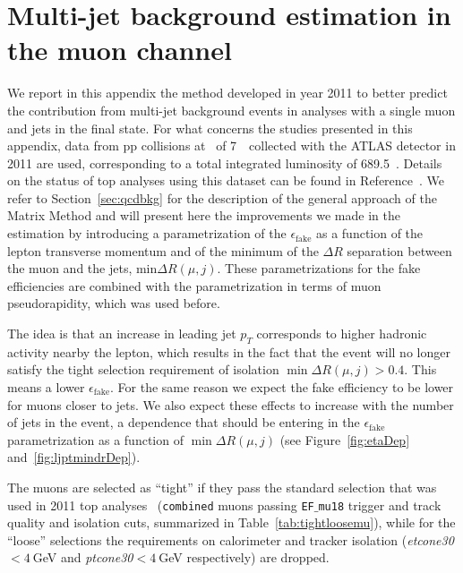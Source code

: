 \clearpage{\pagestyle{empty}\cleardoublepage}

\chapter{Multi-jet background estimation in the muon channel}\label{app:qcdmm}

We report in this appendix the method developed in year 2011 to better predict
the contribution from multi-jet background events in analyses with a single
muon and jets in the final state. 
For what concerns the studies presented in this appendix, data
from pp collisions at \cme\ of 7~\tev\ collected with the ATLAS
detector in 2011 are used, corresponding to a total integrated luminosity
of 689.5~\ipb. Details on the status of top analyses
using this dataset can be found in Reference~\cite{topCommonObjects2012}.
We refer to Section~\ref{sec:qcdbkg}
for the description of the general approach of the
Matrix Method and will present here the improvements we
made in the estimation by introducing a parametrization of
the $\epsilon_\mathrm{fake}$ as a function of the lepton
transverse momentum and of the minimum of the $\Delta R$ separation
between the muon and the jets,  min$\Delta R(\mu,j)$.
These parametrizations for the fake efficiencies 
are combined with the parametrization
in terms of muon pseudorapidity, which was used before.


The idea is that an increase in leading jet $p_T$ corresponds 
to higher hadronic activity nearby the lepton, 
which results in the fact that the event will no 
longer satisfy the tight selection requirement of 
isolation $\min\Delta R(\mu,j)>0.4$. This means a lower 
$\epsilon_\mathrm{fake}$. For the same reason we expect 
the fake efficiency to be lower for muons closer to jets.
We also expect these effects to increase with the number of 
jets in the event, a dependence that should be entering
in the $\epsilon_\mathrm{fake}$ parametrization as a function
of $\min\Delta R(\mu,j)$ (see Figure~\ref{fig:etaDep} and~\ref{fig:ljptmindrDep}). 

The muons are selected as ``tight'' if they pass the standard selection 
that was used in 2011 top analyses~\cite{topCommonObjects2012} 
(\texttt{combined} muons
passing {\tt EF$\_$mu18} trigger and track quality and isolation cuts,
summarized in Table~\ref{tab:tightloosemu}), while for the ``loose'' 
selections the requirements on calorimeter and tracker isolation
(\textit{etcone30}$<4~$GeV and \textit{ptcone30}$<4~$GeV respectively) 
are dropped.

